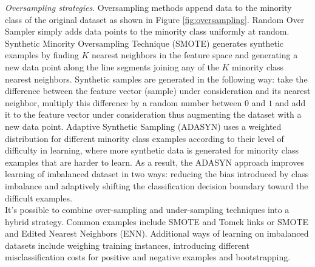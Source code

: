 \textit{Oversampling strategies}. Oversampling methods append data to the minority class of the original dataset as shown in Figure \ref{fig:oversampling}. Random Over Sampler simply adds data points to the minority class uniformly at random. Synthetic Minority Oversampling Technique (SMOTE) generates synthetic examples by finding $K$ nearest neighbors in the feature space and generating a new data point along the line segments joining any of the $K$ minority class nearest neighbors. Synthetic samples are generated in the following way: take the difference between the feature vector (sample) under consideration and its nearest neighbor, multiply this difference by a random number between $0$ and $1$ and add it to the feature vector under consideration thus augmenting the dataset with a new data point. Adaptive Synthetic Sampling (ADASYN) uses a weighted distribution for different minority class examples according to their level of difficulty in learning, where more synthetic data is generated for minority class examples that are harder to learn. As a result, the ADASYN approach improves learning of imbalanced dataset in two ways: reducing the bias introduced by class imbalance and adaptively shifting the classification decision boundary toward the difficult examples.\\ 

It's possible to combine over-sampling and under-sampling techniques into a hybrid strategy. Common examples include SMOTE and Tomek links or SMOTE and Edited Nearest Neighbors (ENN). Additional ways of learning on imbalanced datasets include weighing training instances, introducing different misclassification costs for positive and negative examples and bootstrapping. 


